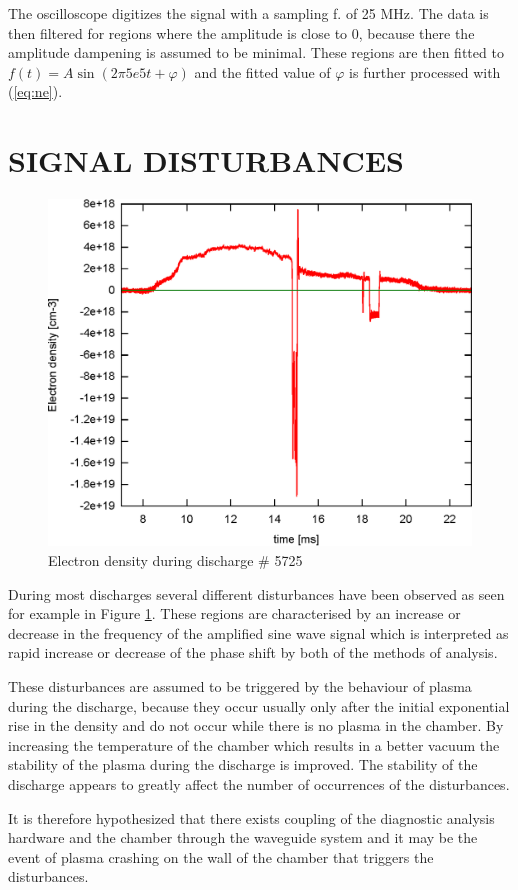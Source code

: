 \documentclass[a4paper,twoside]{articlek}
\begin{document}
The oscilloscope digitizes the signal with a sampling f. of 25 MHz. The data is then filtered for regions where the amplitude is close to 0, because there the amplitude dampening is assumed to be minimal. These regions are then fitted to $f(t)=A\sin(2 \pi 5e5 t+ \varphi)$ and the fitted value of $\varphi$ is further processed with (\ref{eq:ne}).

\section{SIGNAL DISTURBANCES}
\begin{figure}
    \begin{center}
        \includegraphics[width=.45\textwidth]{data.eps}
    \end{center}
    \caption{Electron density during discharge \# 5725}
    \label{fig:data}
\end{figure}

During most discharges several different disturbances have been observed as seen for example in Figure \ref{fig:data}. These regions are characterised by an increase or decrease in the frequency of the amplified sine wave signal which is interpreted as rapid increase or decrease of the phase shift by both of the methods of analysis.

These disturbances are assumed to be triggered by the behaviour of plasma during the discharge, because they occur usually only after the initial exponential rise in the density and do not occur while there is no plasma in the chamber. By increasing the temperature of the chamber which results in a better vacuum the stability of the plasma during the discharge is improved. The stability of the discharge appears to greatly affect the number of occurrences of the disturbances.

It is therefore hypothesized that there exists coupling of the diagnostic analysis hardware and the chamber through the waveguide system and it may be the event of plasma crashing on the wall of the chamber that triggers the disturbances.
\end{document}
